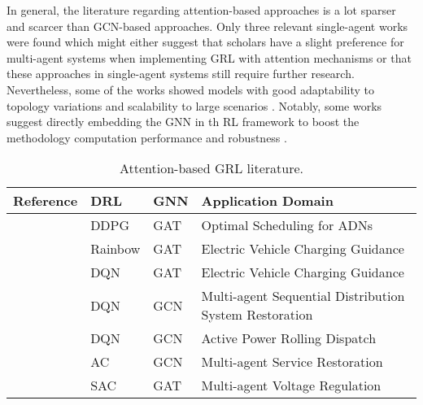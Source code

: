 In general, the literature regarding attention-based approaches is a lot sparser and scarcer than \ac{GCN}-based approaches. Only three relevant single-agent works were found \cite{xingRealtimeOptimalScheduling2023, xingBilevelGraphReinforcement2023, xuRealtimeFastCharging2022} which might either suggest that scholars have a slight preference for multi-agent systems when implementing \ac{GRL} with attention mechanisms or that these approaches in single-agent systems still require further research. Nevertheless, some of the works showed models with good adaptability to topology variations \cite{xingRealtimeOptimalScheduling2023, baiAdaptiveActivePower2023b, chenPhysicalassistedMultiagentGraph2023} and scalability to large scenarios \cite{zhaoLearningSequentialDistribution2022, xingRealtimeOptimalScheduling2023, baiAdaptiveActivePower2023b, chenPhysicalassistedMultiagentGraph2023}. Notably, some works suggest directly embedding the \ac{GNN} in th \ac{RL} framework to boost the methodology computation performance and robustness  \cite{xingRealtimeOptimalScheduling2023, xingRealtimeOptimalScheduling2023}.


\begin{table}[H] 
	\centering
	\caption{Attention-based \acs{GRL} literature.}
	\begin{tabular}{P{2cm}P{2cm}P{2cm}p{5cm}}
		\toprule
		\textbf{Reference} & \textbf{DRL} & \textbf{GNN} & \textbf{Application Domain} \\
		\midrule
		\cite{xingRealtimeOptimalScheduling2023} & DDPG & GAT & Optimal Scheduling for ADNs  \\ 
		\cite{xingBilevelGraphReinforcement2023} & Rainbow & GAT  & Electric Vehicle Charging Guidance \\
		\cite{xuRealtimeFastCharging2022} & DQN & GAT & Electric Vehicle Charging Guidance \\
		\cite{zhaoLearningSequentialDistribution2022} & DQN & GCN & Multi-agent Sequential Distribution System Restoration \\ 
		\cite{baiAdaptiveActivePower2023b} & DQN & GCN & Active Power Rolling Dispatch \\ 
		\cite{fanAttentionBasedMultiAgentGraph2023} & AC & GCN & Multi-agent Service Restoration \\ 
		\cite{chenPhysicalassistedMultiagentGraph2023}  & SAC & GAT  & Multi-agent Voltage Regulation \\
		\bottomrule
	\end{tabular}
	\label{tab:gat-lit}
\end{table}


